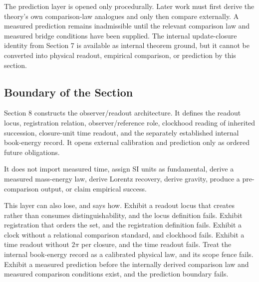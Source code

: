 The prediction layer is opened only procedurally. Later work must first derive the theory's own comparison-law analogues and only then compare externally. A measured prediction remains inadmissible until the relevant comparison law and measured bridge conditions have been supplied. The internal update-closure identity from Section 7 is available as internal theorem ground, but it cannot be converted into physical readout, empirical comparison, or prediction by this section.

\subsection{Boundary of the Section}
Section 8 constructs the observer/readout architecture. It defines the readout locus, registration relation, observer/reference role, clockhood reading of inherited succession, closure-unit time readout, and the separately established internal book-energy record. It opens external calibration and prediction only as ordered future obligations.

It does not import measured time, assign SI units as fundamental, derive a measured mass-energy law, derive Lorentz recovery, derive gravity, produce a pre-comparison output, or claim empirical success.

This layer can also lose, and says how. Exhibit a readout locus that creates rather than consumes distinguishability, and the locus definition fails. Exhibit registration that orders the set, and the registration definition fails. Exhibit a clock without a relational comparison standard, and clockhood fails. Exhibit a time readout without \(2\pi\) per closure, and the time readout fails. Treat the internal book-energy record as a calibrated physical law, and its scope fence fails. Exhibit a measured prediction before the internally derived comparison law and measured comparison conditions exist, and the prediction boundary fails.

